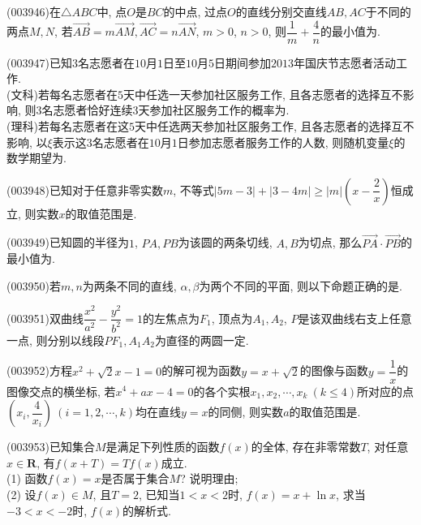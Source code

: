 \item (003946)在$\triangle ABC$中, 点$O$是$BC$的中点, 过点$O$的直线分别交直线$AB,AC$于不同的两点$M,N$, 若$\overrightarrow{AB}=m\overrightarrow{AM}, \overrightarrow{AC}=n\overrightarrow{AN}$, $m>0$, $n>0$, 则$\dfrac 1m+\dfrac 4n$的最小值为.
\item (003947)已知$3$名志愿者在$10$月$1$日至$10$月$5$日期间参加$2013$年国庆节志愿者活动工作.\\
(文科)若每名志愿者在$5$天中任选一天参加社区服务工作, 且各志愿者的选择互不影响, 则$3$名志愿者恰好连续$3$天参加社区服务工作的概率为.\\
(理科)若每名志愿者在这$5$天中任选两天参加社区服务工作, 且各志愿者的选择互不影响, 以$\xi$表示这$3$名志愿者在$10$月$1$日参加志愿者服务工作的人数, 则随机变量$\xi$的数学期望为.
\item (003948)已知对于任意非零实数$m$, 不等式$|5m-3|+|3-4m|\ge |m|\left(x-\dfrac 2x\right)$恒成立, 则实数$x$的取值范围是.
\item (003949)已知圆的半径为$1$, $PA,PB$为该圆的两条切线, $A,B$为切点, 那么$\overrightarrow{PA}\cdot\overrightarrow{PB}$的最小值为.
\item (003950)若$m,n$为两条不同的直线, $\alpha,\beta$为两个不同的平面, 则以下命题正确的是.
\item (003951)双曲线$\dfrac{x^2}{a^2}-\dfrac{y^2}{b^2}=1$的左焦点为$F_1$, 顶点为$A_1,A_2$, $P$是该双曲线右支上任意一点, 则分别以线段$PF_1,A_1A_2$为直径的两圆一定.
\item (003952)方程$x^2+\sqrt{2}x-1=0$的解可视为函数$y=x+\sqrt{2}$的图像与函数$y=\dfrac 1x$的图像交点的横坐标, 若$x^4+ax-4=0$的各个实根$x_1,x_2,\cdots,x_k \ (k\le 4)$所对应的点$\left(x_i,\dfrac{4}{x_i}\right) \ (i=1,2,\cdots,k)$均在直线$y=x$的同侧, 则实数$a$的取值范围是.
\item (003953)已知集合$M$是满足下列性质的函数$f(x)$的全体, 存在非零常数$T$, 对任意$x\in \mathbf{R}$, 有$f(x+T)=Tf(x)$成立.\\
(1) 函数$f(x)=x$是否属于集合$M$? 说明理由;\\
(2) 设$f(x)\in M$, 且$T=2$, 已知当$1<x<2$时, $f(x)=x+\ln x$, 求当$-3<x<-2$时, $f(x)$的解析式.
